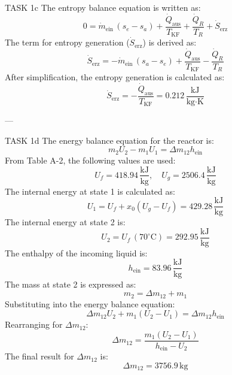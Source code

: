 TASK 1c  
The entropy balance equation is written as:  
\[
0 = \dot{m}_{\text{ein}} \, (s_e - s_a) + \frac{\dot{Q}_{\text{aus}}}{T_{\text{KF}}} + \frac{\dot{Q}_R}{T_R} + \dot{S}_{\text{erz}}
\]  
The term for entropy generation (\( \dot{S}_{\text{erz}} \)) is derived as:  
\[
\dot{S}_{\text{erz}} = -\dot{m}_{\text{ein}} \, (s_a - s_e) + \frac{\dot{Q}_{\text{aus}}}{T_{\text{KF}}} - \frac{\dot{Q}_R}{T_R}
\]  
After simplification, the entropy generation is calculated as:  
\[
\dot{S}_{\text{erz}} = -\frac{\dot{Q}_{\text{aus}}}{T_{\text{KF}}} = 0.212 \, \frac{\text{kJ}}{\text{kg·K}}
\]  

---

TASK 1d  
The energy balance equation for the reactor is:  
\[
m_2 U_2 - m_1 U_1 = \Delta m_{12} h_{\text{ein}}
\]  
From Table A-2, the following values are used:  
\[
U_f = 418.94 \, \frac{\text{kJ}}{\text{kg}}, \quad U_g = 2506.4 \, \frac{\text{kJ}}{\text{kg}}
\]  
The internal energy at state 1 is calculated as:  
\[
U_1 = U_f + x_0 (U_g - U_f) = 429.28 \, \frac{\text{kJ}}{\text{kg}}
\]  
The internal energy at state 2 is:  
\[
U_2 = U_f \, (70^\circ\text{C}) = 292.95 \, \frac{\text{kJ}}{\text{kg}}
\]  
The enthalpy of the incoming liquid is:  
\[
h_{\text{ein}} = 83.96 \, \frac{\text{kJ}}{\text{kg}}
\]  
The mass at state 2 is expressed as:  
\[
m_2 = \Delta m_{12} + m_1
\]  
Substituting into the energy balance equation:  
\[
\Delta m_{12} U_2 + m_1 (U_2 - U_1) = \Delta m_{12} h_{\text{ein}}
\]  
Rearranging for \( \Delta m_{12} \):  
\[
\Delta m_{12} = \frac{m_1 (U_2 - U_1)}{h_{\text{ein}} - U_2}
\]  
The final result for \( \Delta m_{12} \) is:  
\[
\Delta m_{12} = 3756.9 \, \text{kg}
\]  